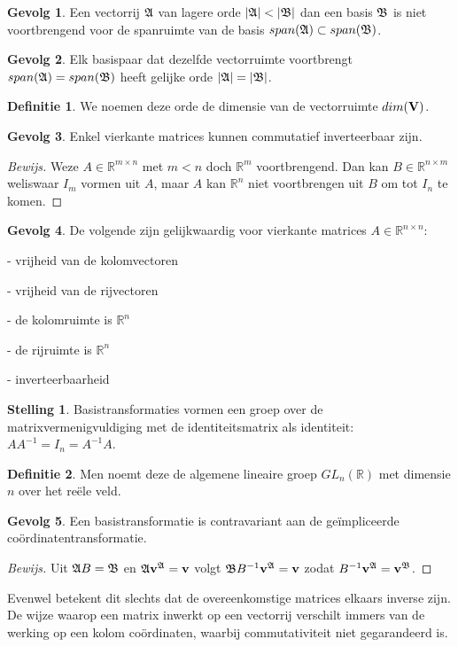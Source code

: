 \documentclass{amsart}
\theoremstyle{definition}
\newtheorem{thm}{Stelling}[section]
\newtheorem{dfn}{Definitie}[section]
\newtheorem{csq}{Gevolg}[section]
\newenvironment{bewijs}{\begin{proof}[Bewijs]}{\end{proof}}
\newcommand{\realnums}{\mathbb{R}}
\newcommand{\realn}[1][n]{\realnums^{#1}}
\newcommand{\realmx}[2][n]{\realn[#2 \times #1]}
\newcommand{\realnxn}{\realmx{n}}
\newcommand{\realmxn}{\realmx{m}}
\newcommand{\vecspace}[1][v]{\mathrm{\mathbf{\MakeUppercase#1}}}
\newcommand{\abs}[1]{\lvert{#1}\rvert}
\newcommand{\vvec}[1][v]{\mathbf{#1}}
\newcommand{\vecrow}[1][a]{\mathfrak{\MakeUppercase{#1}}}
\newcommand{\cvec}[2]{{#1}^{#2}}
\newcommand{\cvecv}[2][v]{\cvec{\vvec[#1]}{#2}}
\newcommand{\cvecva}[1][a]{\cvecv{\vecrow[#1]}}
\begin{document}
\begin{csq}
	Een vectorrij $\vecrow$ van lagere orde $\abs\vecrow < \abs{\vecrow[b]}$ dan een basis $\vecrow[b]$ is niet voortbrengend voor de spanruimte van de basis $span(\vecrow) \subset span(\vecrow[b])$.
\end{csq}

\begin{csq}
	Elk basispaar dat dezelfde vectorruimte voortbrengt $span(\vecrow) = span(\vecrow[b])$ heeft gelijke orde $\abs\vecrow = \abs{\vecrow[b]}$.
\end{csq}

\begin{dfn}
	We noemen deze orde de dimensie van de vectorruimte $dim(\vecspace)$.
\end{dfn}

\begin{csq}
	Enkel vierkante matrices kunnen commutatief inverteerbaar zijn.
	\begin{bewijs}
		Weze $A \in \realmxn$ met $m < n$ doch $\realn[m]$ voortbrengend.
		Dan kan $B \in \realmx[m]{n}$ weliswaar $I_m$ vormen uit $A$, maar $A$ kan $\realn$ niet voortbrengen uit $B$ om tot $I_n$ te komen.
	\end{bewijs}
\end{csq}

\begin{csq}
	De volgende zijn gelijkwaardig voor vierkante matrices $A \in \realnxn$:

	- vrijheid van de kolomvectoren

	- vrijheid van de rijvectoren

	- de kolomruimte is $\realn$

	- de rijruimte is $\realn$

	- inverteerbaarheid
\end{csq}

\begin{thm}
	Basistransformaties vormen een groep over de matrixvermenigvuldiging met de identiteitsmatrix als identiteit: $AA^{-1} = I_n = A^{-1}A$.
\end{thm}

\begin{dfn}
	Men noemt deze de algemene lineaire groep $GL_n(\realnums)$ met dimensie $n$ over het reële veld.
\end{dfn}

\begin{csq}
	Een basistransformatie is contravariant aan de ge\"{i}mpliceerde co\"{o}rdinatentransformatie.
	\begin{bewijs}
		Uit $\vecrow B = \vecrow[b]$ en $\vecrow \cvecva= \vvec$ volgt $\vecrow[b] B^{-1} \cvecva = \vvec$ zodat $B^{-1} \cvecva = \cvecva[b]$.
	\end{bewijs}
	Evenwel betekent dit slechts dat de overeenkomstige matrices elkaars inverse zijn.
	De wijze waarop een matrix inwerkt op een vectorrij verschilt immers van de werking op een kolom coördinaten, waarbij commutativiteit niet gegarandeerd is.
\end{csq}
\end{document}

